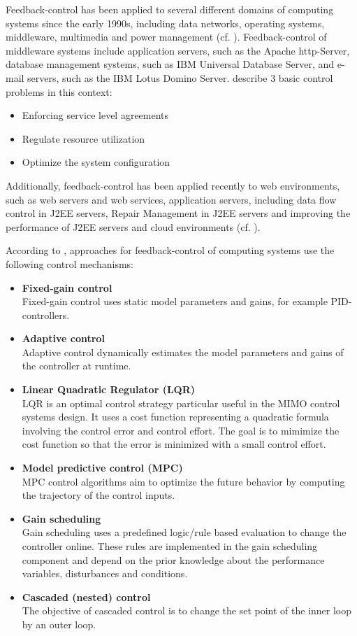 Feedback-control has been applied to several different domains of computing systems since the early 1990s, including data networks, operating systems, middleware, multimedia and power management (cf. \cite{Hellerstein:2004a}). Feedback-control of middleware systems include application servers, such as the Apache http-Server, database management systems, such as IBM Universal Database Server, and e-mail servers, such as the IBM Lotus Domino Server. \cite{Hellerstein:2004a} describe 3 basic control problems in this context:
\begin{itemize}
	\item Enforcing service level agreements
	\item Regulate resource utilization
	\item Optimize the system configuration
\end{itemize}

Additionally, feedback-control has been applied recently to web environments, such as web servers and web services, application servers, including data flow control in J2EE servers, Repair Management in J2EE servers and improving the performance of J2EE servers and cloud environments (cf. \cite{Gullapalli:2011vn}).

According to \cite{Patikirikorala:2012ky}, approaches for feedback-control of computing systems use the following control mechanisms:
\begin{itemize}
	\item \textbf{Fixed-gain control}\\
	Fixed-gain control uses static model parameters and gains, for example \ac{PID}-controllers.
	\item \textbf{Adaptive control}\\
	Adaptive control dynamically estimates the model parameters and gains of the controller at runtime.
	\item \textbf{Linear Quadratic Regulator (LQR)}\\
	LQR is an optimal control strategy particular useful in the MIMO control systems design. It uses a cost function representing a quadratic formula involving the control error and control effort. The goal is to mimimize the cost function so that the error is minimized with a small control effort.
	\item \textbf{Model predictive control (MPC)}\\
	MPC control algorithms aim to optimize the future behavior by computing the trajectory of the control inputs. 
	\item \textbf{Gain scheduling}\\
	Gain scheduling uses a predefined logic/rule based evaluation to change the controller online. These rules are implemented in the gain scheduling component and depend on the prior knowledge about the performance variables, disturbances and conditions.
	\item \textbf{Cascaded (nested) control}\\
	The objective of cascaded control is to change the set point of the inner loop by an outer loop.
\end{itemize}

